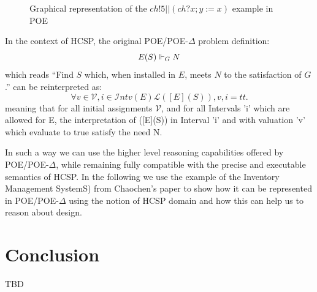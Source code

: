 \documentclass[runningheads,a4paper]{llncs}
\begin{document}
\begin{figure}[hbt]
  \caption{Graphical representation of the $ch!5 || (ch?x; y := x)$
    example in POE}
  \label{fig:Parallel}
\end{figure}

In the context of HCSP, the original POE/POE-$\Delta$ problem definition: \[E(S)\Vdash_{G}N\]
which reads ``Find $S$ which, when installed in $E$, meets $N$ to the
satisfaction of $G$.'' can be reinterpreted as:
\[
  \forall v \in \mathcal{V}, i \in \mathcal{I}ntv(E)
  \mathcal{L}([E](S)), v, i = tt.
\]
meaning that for all initial assignments $\mathcal{V}$, and for all
Intervals 'i' which are allowed for E, the interpretation of ([E](S))
in Interval 'i' and with valuation 'v' which evaluate to true satisfy
the need N.

In such a way we can use the higher level reasoning capabilities
offered by POE/POE-$\Delta$, while remaining fully compatible with the
precise and executable semantics of HCSP.
In the following we use the example of the Inventory Management
SystemS) from Chaochen's paper \citep{chaochen1996formal} to show how
it can be represented in POE/POE-$\Delta$ using the notion of HCSP
domain and how this can help us to reason about design.


\section{Conclusion}
\label{sect:Conclusion}
TBD

\frenchspacing  
\end{document}
